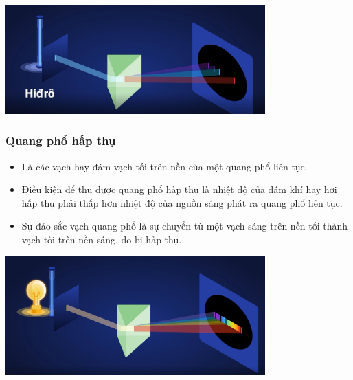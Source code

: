 \begin{center}
	\includegraphics[width=10cm]{../figs/VN12-PH-36-L-021-2-2.JPG}
\end{center}

\subsubsection{Quang phổ hấp thụ}

\begin{itemize}
	
	\item Là các vạch hay đám vạch tối trên nền của một quang phổ liên tục.
	
	\item Điều kiện để thu được quang phổ hấp thụ là nhiệt độ của đám khí hay hơi hấp thụ phải thấp hơn nhiệt độ của nguồn sáng phát ra quang phổ liên tục.
	
	\item Sự đảo sắc vạch quang phổ là sự chuyển từ một vạch sáng trên nền tối thành vạch tối trên nền sáng, do bị hấp thụ.
\end{itemize}
\begin{center}
	\includegraphics[width=10cm]{../figs/VN12-PH-36-L-021-2-3.JPG}
\end{center}
